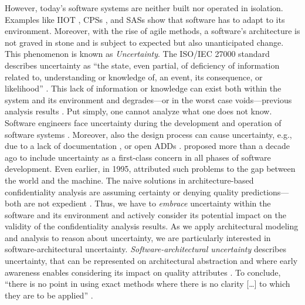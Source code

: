 However, today's software systems are neither built nor operated in isolation.
Examples like \ac{IIOT} \cite{arat_attack_2023}, \acp{CPS} \cite{acosta_uncertainty_2022}, and \acp{SAS} \cite{weyns_introduction_2020} show that software has to adapt to its environment.
Moreover, with the rise of agile methods, a software's architecture is not graved in stone and is subject to expected but also unanticipated change.
This phenomenon is known as \emph{Uncertainty}.
The ISO/IEC 27000 standard describes uncertainty as \enquote{the state, even partial, of deficiency of information related to, understanding or knowledge of, an event, its consequence, or likelihood} \cite{international_organization_for_standardization_isoiec_2018}.
This lack of information or knowledge can exist both within the system and its environment \cite{perez-palacin_uncertainties_2014} and degrades---or in the worst case voids---previous analysis results \cite{perez-palacin_dealing_2014}.
Put simply, one cannot analyze what one does not know.
Software engineers face uncertainty during the development and operation of software systems \cite{ubayashi_when_2019}.
Moreover, also the design process can cause uncertainty, e.g., due to a lack of documentation \cite{harrison_nature_2024}, or open \acp{ADD} \cite{mcconnell_software_1998}.
\textcite{garlan_software_2010} proposed more than a decade ago to include uncertainty as a first-class concern in all phases of software development.
Even earlier, in 1995, \textcite{jackson_world_1995} attributed such problems to the gap between the world and the machine.
The naive solutions in architecture-based confidentiality analysis are assuming certainty \cite{seifermann_architectural_2022} or denying quality predictions---both are not expedient \cite{ubayashi_when_2019}.
Thus, we have to \emph{embrace} uncertainty within the software and its environment and actively consider its potential impact on the validity of the confidentiality analysis results.
As we apply architectural modeling and analysis to reason about uncertainty, we are particularly interested in software-architectural uncertainty.
\emph{Software-architectural uncertainty} describes uncertainty, that can be represented on architectural abstraction and where early awareness enables considering its impact on quality attributes \cite{hahner_architecture-based_2023}.
To conclude, \enquote{there is no point in using exact methods where there is no clarity [\dots] to which they are to be applied} \cite{von_neumann_theory_1944}.





